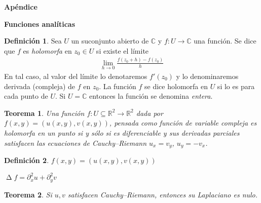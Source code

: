 \documentclass{report}
\newcommand{\realNumbers}{\mathbb{R}}
\newcommand{\complexNumbers}{\mathbb{C}}
\DeclareMathOperator{\laplacian}{\Delta}
\theoremstyle{plain}
\newtheorem{theorem}{Teorema}
\theoremstyle{remark}
\theoremstyle{definition}
\newtheorem{definition}{Definición}
\begin{document}

\newpage
{\huge \textbf{Apéndice}}



\textbf{Funciones analíticas}
\begin{definition}
  Sea \(U\) un suconjunto abierto de \(\complexNumbers\) y \(f : U \rightarrow \complexNumbers\) una función.
  Se dice que \(f\) es \emph{holomorfa} en \(z_0 \in U\) si existe el límite
  \begin{align}
    \lim_{h \rightarrow 0} \frac{f(z_0 + h) - f(z_0)}{h}
  \end{align}
  En tal caso, al valor del límite lo denotaremos \(f'(z_0)\) y lo denominaremos derivada (compleja) de \(f\) en \(z_0\).
  La función \(f\) se dice holomorfa en \(U\) si lo es para cada punto de \(U\).
  Si \(U = \complexNumbers\) entonces la función se denomina \emph{entera}.
\end{definition}

\begin{theorem}
  Una función \(f : U \subseteq \realNumbers^2 \rightarrow \realNumbers^2\) dada por  \(f(x, y) = (u(x, y), v(x, y))\), pensada como función de variable compleja es holomorfa en un punto si y sólo si es diferenciable y sus derivadas parciales satisfacen las ecuaciones de Cauchy--Riemann \(u_x = v_y\), \(u_y = - v_x\).
\end{theorem}


\begin{definition}
  \(f(x, y) = (u(x, y), v(x, y))\)

  \(\laplacian f = \partial_x^2 u + \partial_y^2 v\)
\end{definition}

\begin{theorem}
  Si \(u, v\) satisfacen Cauchy--Riemann, entonces su Laplaciano es nulo.
\end{theorem}


\end{document}
